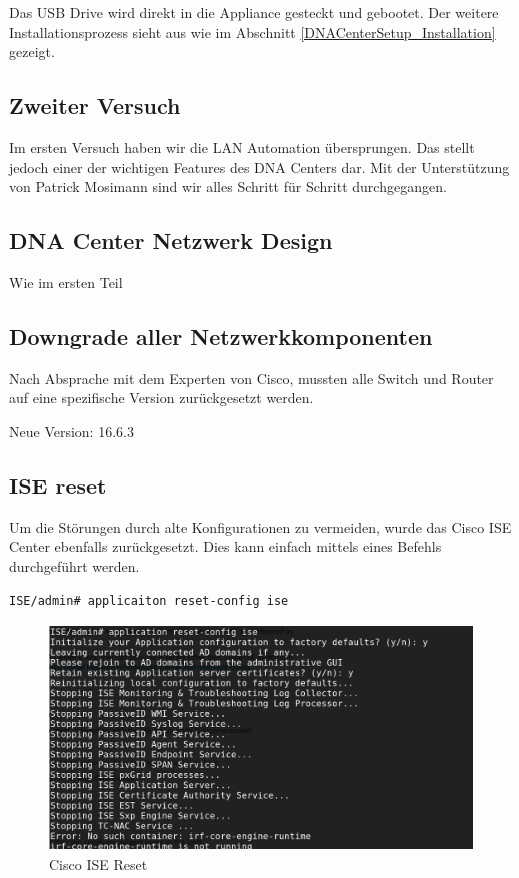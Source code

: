 Das USB Drive wird direkt in die Appliance gesteckt und gebootet. Der weitere Installationsprozess sieht aus wie im Abschnitt \ref{DNACenterSetup_Installation} gezeigt. 


\subsection{Zweiter Versuch}
Im ersten Versuch haben wir die LAN Automation übersprungen. Das stellt jedoch einer der wichtigen Features des DNA Centers dar. Mit der Unterstützung von Patrick Mosimann sind wir alles Schritt für Schritt durchgegangen. 

\subsection{DNA Center Netzwerk Design}
Wie im ersten Teil

\subsection{Downgrade aller Netzwerkkomponenten}
Nach Absprache mit dem Experten von Cisco, mussten alle Switch und Router auf eine spezifische Version zurückgesetzt werden.

Neue Version: 16.6.3

\subsection{ISE reset}
Um die Störungen durch alte Konfigurationen zu vermeiden, wurde das Cisco ISE Center ebenfalls zurückgesetzt. Dies kann einfach mittels eines Befehls durchgeführt werden.

\begin{lstlisting}[language=bash]
ISE/admin# applicaiton reset-config ise
\end{lstlisting}

\begin{figure}[H]
	\centering
	\includegraphics[height=6cm]{img/secondtry/s2t-cisco-ise-reset.png}
	\caption{Cisco ISE Reset}
	\label{fig:dna-ise-reset-1}
\end{figure}

